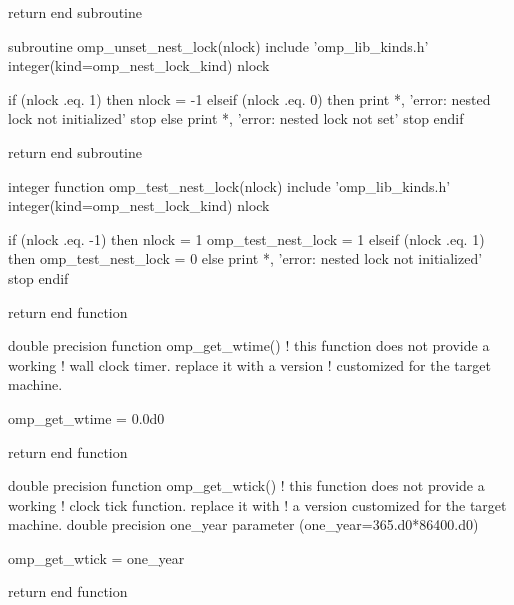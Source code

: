 {\begin{codepar}
  return
end subroutine

subroutine omp\_unset\_nest\_lock(nlock)
  include 'omp\_lib\_kinds.h'
  integer(kind=omp\_nest\_lock\_kind) nlock

  if (nlock .eq. 1) then
    nlock = -1
  elseif (nlock .eq. 0) then
    print *, 'error: nested lock not initialized'
    stop
  else
    print *, 'error: nested lock not set'
    stop
  endif

  return
end subroutine

integer function omp\_test\_nest\_lock(nlock)
  include 'omp\_lib\_kinds.h'
  integer(kind=omp\_nest\_lock\_kind) nlock

  if (nlock .eq. -1) then
    nlock = 1
    omp\_test\_nest\_lock = 1
  elseif (nlock .eq. 1) then
    omp\_test\_nest\_lock = 0
  else
    print *, 'error: nested lock not initialized'
    stop
  endif

  return
end function

double precision function omp\_get\_wtime()
  ! this function does not provide a working
  ! wall clock timer. replace it with a version
  ! customized for the target machine.

  omp\_get\_wtime = 0.0d0

  return
end function

double precision function omp\_get\_wtick()
  ! this function does not provide a working
  ! clock tick function. replace it with
  ! a version customized for the target machine.
  double precision one\_year
  parameter (one\_year=365.d0*86400.d0)

  omp\_get\_wtick = one\_year

  return
end function
\end{codepar}} %


